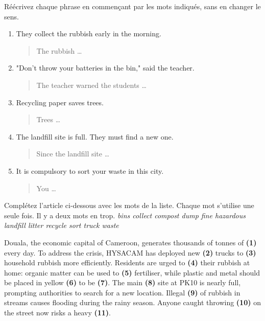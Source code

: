 \documentclass[11pt]{article}
\begin{document}
\begin{exercice}
Réécrivez chaque phrase en commençant par les mots indiqués, sans en changer le sens.
\begin{enumerate}
\item They collect the rubbish early in the morning.
\begin{quote} The rubbish \dots
\end{quote}
\item "Don't throw your batteries in the bin," said the teacher.
\begin{quote} The teacher warned the students \dots
\end{quote}
\item Recycling paper saves trees.
\begin{quote} Trees \dots
\end{quote}
\item The landfill site is full. They must find a new one.
\begin{quote} Since the landfill site \dots
\end{quote}
\item It is compulsory to sort your waste in this city.
\begin{quote} You \dots
\end{quote}
\end{enumerate}
\end{exercice}

\begin{exercice}
Complétez l'article ci-dessous avec les mots de la liste. Chaque mot s'utilise une seule fois. Il y a deux mots en trop.
\medskip
\noindent \textit{bins \quad collect \quad compost \quad dump \quad fine \quad hazardous \quad landfill \quad litter \quad recycle \quad sort \quad truck \quad waste}

\begin{textebox}
Douala, the economic capital of Cameroon, generates thousands of tonnes of \textbf{(1)} every day. To address the crisis, HYSACAM has deployed new \textbf{(2)} trucks to \textbf{(3)} household rubbish more efficiently. Residents are urged to \textbf{(4)} their rubbish at home: organic matter can be used to \textbf{(5)} fertiliser, while plastic and metal should be placed in yellow \textbf{(6)} to be \textbf{(7)}. The main \textbf{(8)} site at PK10 is nearly full, prompting authorities to search for a new location. Illegal \textbf{(9)} of rubbish in streams causes flooding during the rainy season. Anyone caught throwing \textbf{(10)} on the street now risks a heavy \textbf{(11)}.
\end{textebox}
\end{exercice}
\end{document}
